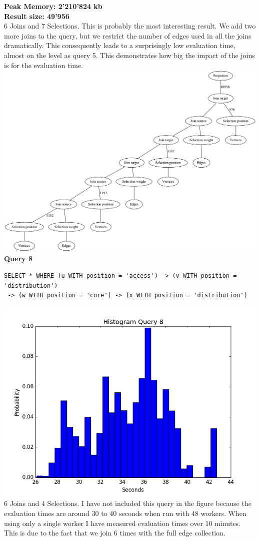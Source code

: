 \documentclass[11pt,singlecolumn]{scrartcl}
\begin{document}
\textbf{Peak Memory: 2'210'824 kb}\\
\textbf{Result size: 49'956}\\
6 Joins and 7 Selections. This is probably the most interesting result. We add two more joins to the query, but we restrict the number of edges used in all the joins dramatically. This consequently leads to a surprisingly low evaluation time, almost on the level as query 5. This demonstrates how big the impact of the joins is for the evaluation time.
\clearpage
\includegraphics[width=1\textwidth]{graph7}
\clearpage
\textbf{Query 8}\\
\begin{verbatim}
SELECT * WHERE (u WITH position = 'access') -> (v WITH position = 'distribution')
 -> (w WITH position = 'core') -> (x WITH position = 'distribution')\end{verbatim}
\includegraphics[width=1\textwidth]{q81}
6 Joins and 4 Selections. I have not included this query in the figure because the evaluation times are around 30 to 40 seconds when run with 48 workers. When using only a single worker I have measured evaluation times over 10 minutes. This is due to the fact that we join 6 times with the full edge collection.
\clearpage
\end{document}
